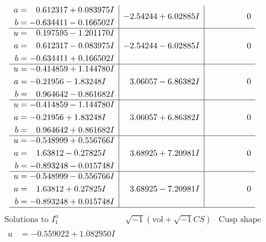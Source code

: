 \documentclass[1p]{elsarticle_modified}
\theoremstyle{definition}
\newcommand{\I}{\sqrt{-1}}
\begin{document}
$$\begin{array}{c|c|c}
\begin{aligned}
a &= \phantom{-}0.612317 + 0.083975 I \\
b &= -0.634411 - 0.166502 I\end{aligned}
 & -2.54244 + 6.02885 I & \phantom{-0.000000 } 0 \\ \hline\begin{aligned}
u &= \phantom{-}0.197595 - 1.201170 I \\
a &= \phantom{-}0.612317 - 0.083975 I \\
b &= -0.634411 + 0.166502 I\end{aligned}
 & -2.54244 - 6.02885 I & \phantom{-0.000000 } 0 \\ \hline\begin{aligned}
u &= -0.414859 + 1.144780 I \\
a &= -0.21956 - 1.83248 I \\
b &= \phantom{-}0.964642 - 0.861682 I\end{aligned}
 & \phantom{-}3.06057 - 6.86382 I & \phantom{-0.000000 } 0 \\ \hline\begin{aligned}
u &= -0.414859 - 1.144780 I \\
a &= -0.21956 + 1.83248 I \\
b &= \phantom{-}0.964642 + 0.861682 I\end{aligned}
 & \phantom{-}3.06057 + 6.86382 I & \phantom{-0.000000 } 0 \\ \hline\begin{aligned}
u &= -0.548999 + 0.556766 I \\
a &= \phantom{-}1.63812 - 0.27825 I \\
b &= -0.893248 - 0.015748 I\end{aligned}
 & \phantom{-}3.68925 + 7.20981 I & \phantom{-0.000000 } 0 \\ \hline\begin{aligned}
u &= -0.548999 - 0.556766 I \\
a &= \phantom{-}1.63812 + 0.27825 I \\
b &= -0.893248 + 0.015748 I\end{aligned}
 & \phantom{-}3.68925 - 7.20981 I & \phantom{-0.000000 } 0\\
 \hline 
 \end{array}$$\newpage$$\begin{array}{c|c|c}  
\text{Solutions to }I^u_{1}& \I (\text{vol} + \sqrt{-1}CS) & \text{Cusp shape}\\
 \hline 
\begin{aligned}
u &= -0.559022 + 1.082950 I \\

\end{aligned}
\end{array}$$
\end{document}
